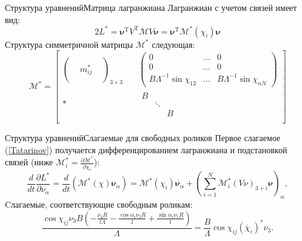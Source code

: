 \documentclass{beamer}
\newcommand\ddfrac[2]{\displaystyle\frac{\displaystyle #1}{\displaystyle #2}}
\newcommand\M[0]{\mathcal{M}} %
\renewcommand{\vec}[1]{\boldsymbol{\mathbf{#1}}}
\begin{document}
\begin{frame}{Структура уравнений}{Матрица лагранжиана}    
Лагранжиан с учетом связей имеет вид:
$$ 2L^{*}  = \vec{\nu}^\mathrm{T} V^\mathrm{T}\M V\vec{\nu} = \vec{\nu}^\mathrm{T} \M^*(\chi_i)\vec{\nu} $$
Структура симметричной матрицы $\M^*$ следующая:
$$
\M^* = \begin{bmatrix}
        \left(\begin{matrix}&&\\&m^*_{ij}&\\&&\end{matrix}\right)_{3\times3} \quad & \left(\begin{matrix} 0&\ldots& 0 \\ 0&\ldots&0 \\ B\Lambda^{-1}\sin\chi_{12}&\ldots& B\Lambda^{-1}\sin\chi_{nN} \end{matrix}\right) \\[25pt]
        *          & \begin{matrix} B & & \\ & \ddots & \\ & & B \end{matrix} \\
    \end{bmatrix}
$$
\end{frame}

\begin{frame}{Структура уравнений}{Слагаемые для свободных роликов}    
Первое слагаемое (\ref{Tatarinov}) получается дифференцированием лагранжиана и подстановкой связей (ниже $\M^*_i = \ddfrac{\partial \M^*}{\partial \chi_i}$):
\begin{equation*}
    \frac{d}{dt}\frac{\partial L^{*}}{\partial \nu_\alpha} = \frac{d}{dt}(\M^*(\chi)\vec{\nu}_\alpha) = 
    \M^*(\chi_i)\dot{\vec{\nu}_\alpha} +
    \left(\sum_{i=1}^{N}\M^*_i(V\nu)_{3+i}\vec{\nu}\right)_\alpha,
\end{equation*}
Cлагаемые, соответствующие свободным роликам:
\begin{equation*}
    \frac{\cos\chi_{ij} \nu_3 B \left( -\ddfrac{\nu_3 R}{l \Lambda}-\ddfrac{\cos\alpha_i \nu_2 R}{l}+\ddfrac{\sin\alpha_i \nu_1 R}{l}\right) }{\Lambda} = \frac{B}{\Lambda}\cos\chi_{ij}(\dot{\chi_i})^*\nu_3.
\end{equation*}
\end{frame}
\end{document}
